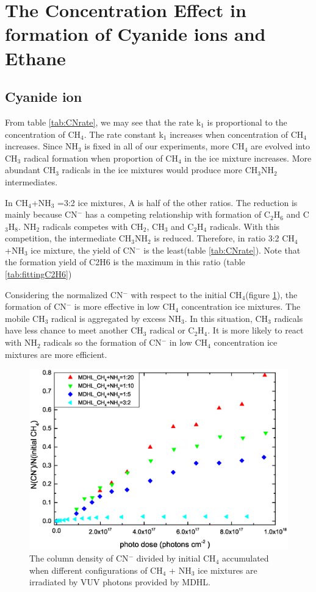 \section{The Concentration Effect in formation of Cyanide ions and Ethane}

\subsection{Cyanide ion}

From table \ref{tab:CNrate}, we may see that the rate k$_1$ is proportional to the concentration of CH$_4$. The rate constant k$_1$ increases when concentration of CH$_4$ increases. Since NH$_3$ is fixed in all of our experiments, more CH$_4$ are evolved into CH$_3$ radical formation when proportion of CH$_4$ in the ice mixture increases. More abundant CH$_3$ radicals in the ice mixtures would produce more CH$_3$NH$_2$ intermediates.

In CH$_4$+NH$_3$ =3:2 ice mixtures, A is half of the other ratios. The reduction is mainly because CN$^-$ has a competing relationship with formation of C$_2$H$_6$ and C$_3$H$_8$. NH$_2$ radicals competes with CH$_2$, CH$_3$ and C$_2$H$_4$ radicals. With this competition, the intermediate CH$_3$NH$_2$ is reduced. Therefore, in ratio 3:2 CH$_4$+NH$_3$ ice mixture, the yield of CN$^-$ is the least(table \ref{tab:CNrate}). Note that the formation yield of C2H6 is the maximum in this ratio (table \ref{tab:fittingC2H6})


Considering the normalized CN$^-$ with respect to the initial CH$_4$(figure \ref{fig:CN_CH4}), the formation of CN$^-$ is more effective in low CH$_4$ concentration ice mixtures. The mobile CH$_3$ radical is aggregated by excess NH$_3$. In this situation, CH$_3$ radicals have less chance to meet another CH$_3$ radical or C$_2$H$_4$. It is more likely to react with NH$_2$ radicals so the formation of CN$^-$ in low CH$_4$ concentration ice mixtures are more efficient.

\begin{figure}
\centering
\includegraphics[width=\textwidth]{figures/chapter3/CN_CH4.eps}
\caption{The column density of CN$^-$ divided by initial CH$_4$ accumulated when different configurations of CH$_4$ + NH$_3$ ice mixtures are irradiated by VUV photons provided by MDHL.}
\label{fig:CN_CH4}
\end{figure}


